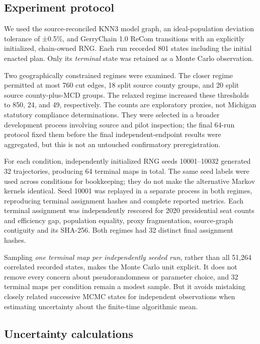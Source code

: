 \documentclass[
  10pt,
]{article}
\begin{document}
\hypertarget{experiment-protocol}{%
\subsection{Experiment protocol}\label{experiment-protocol}}

We used the source-reconciled KNN3 model graph, an ideal-population
deviation tolerance of ±0.5\%, and GerryChain 1.0 ReCom transitions with
an explicitly initialized, chain-owned RNG. Each run recorded 801 states
including the initial enacted plan. Only its \emph{terminal} state was
retained as a Monte Carlo observation.

Two geographically constrained regimes were examined. The closer regime
permitted at most 760 cut edges, 18 split source county groups, and 20
split source county-plus-MCD groups. The relaxed regime increased these
thresholds to 850, 24, and 49, respectively. The counts are exploratory
proxies, not Michigan statutory compliance determinations. They were
selected in a broader development process involving source and pilot
inspection; the final 64-run protocol fixed them before the final
independent-endpoint results were aggregated, but this is not an
untouched confirmatory preregistration.

For each condition, independently initialized RNG seeds 10001--10032
generated 32 trajectories, producing 64 terminal maps in total. The same
seed labels were used across conditions for bookkeeping; they do not
make the alternative Markov kernels identical. Seed 10001 was replayed
in a separate process in both regimes, reproducing terminal assignment
hashes and complete reported metrics. Each terminal assignment was
independently rescored for 2020 presidential seat counts and efficiency
gap, population equality, proxy fragmentation, source-graph contiguity
and its SHA-256. Both regimes had 32 distinct final assignment hashes.

Sampling \emph{one terminal map per independently seeded run}, rather
than all 51,264 correlated recorded states, makes the Monte Carlo unit
explicit. It does not remove every concern about pseudorandomness or
parameter choice, and 32 terminal maps per condition remain a modest
sample. But it avoids mistaking closely related successive MCMC states
for independent observations when estimating uncertainty about the
finite-time algorithmic mean.

\hypertarget{uncertainty-calculations}{%
\subsection{Uncertainty calculations}\label{uncertainty-calculations}}
\end{document}
